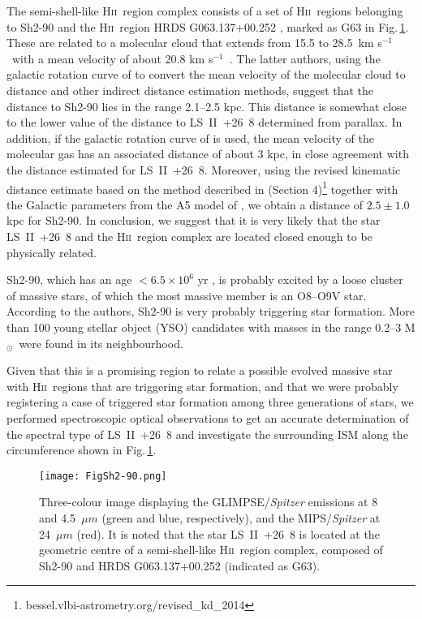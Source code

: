 \documentclass[fleqn,usenatbib]{mnras}
\def\ks{km s$^{-1}$}
\def\hii{H\textsc{ii}}
\def\msol{M$_\odot$}
\begin{document}
The semi-shell-like H\textsc{ii}~region complex consists of a set of \hii~regions belonging to 
Sh2-90 \citep{1959ApJS....4..257S} and the \hii~region HRDS G063.137+00.252 \citep{2012ApJ...759...96B}, 
marked as G63 in Fig.\,\ref{fig:Sh2-90}. These are related to a molecular cloud that extends 
from 15.5 to 28.5~km s$^{-1}$~with a mean velocity of about 20.8  \ks~\citep{1983A&A...124....1L,2014A&A...566A.122S}. 
The latter authors, using the galactic rotation curve of \citet{brand93} to convert the 
mean velocity of the molecular cloud to distance and other indirect distance estimation methods, 
suggest that the distance to Sh2-90 lies in the range 2.1--2.5 kpc. This distance is 
somewhat close to the lower value of the distance to LS~II~+26~8 determined from parallax. 
In addition, if the galactic rotation curve of \citet{fich89} is used, the mean velocity of 
the molecular gas has an associated distance of about 3 kpc, in close agreement with the distance estimated for LS~II~+26~8.   
Moreover, using the revised kinematic distance estimate based on the method described in 
\citet{reid09} (Section 4)\footnote{bessel.vlbi-astrometry.org/revised\_kd\_2014} together with the 
Galactic parameters from the A5 model of \citet{reid14}, we obtain a distance of $2.5\pm1.0$ kpc 
for Sh2-90. In conclusion, we suggest that it is very likely that the star LS~II~+26~8 and the 
\hii~region complex are located closed enough to be physically related.

Sh2-90, which has an age $< 6.5 \times 10^{6}$ yr \citep{2014A&A...566A.122S}, is probably 
excited by a loose cluster of massive stars, of which the most massive member is an O8--O9V 
star. According to the authors, Sh2-90 is very probably triggering star formation. More than 100 
young stellar object (YSO) candidates with masses in the range 0.2--3 \msol~were found in its neighbourhood.

Given that this is a promising region to relate a possible evolved massive star with 
\hii~regions that are triggering star formation, and that we were probably registering a case of 
triggered star formation among three generations of stars, we performed spectroscopic optical 
observations to get an accurate determination of the spectral type of LS~II~+26~8 and investigate the 
surrounding ISM along the circumference shown in Fig.\,\ref{fig:Sh2-90}.


\begin{figure}
    \centering
	\texttt{[image: FigSh2-90.png]}
    \caption{Three-colour image displaying the GLIMPSE/{\it Spitzer} emissions at 8 and 4.5~$\mu m$ 
(green and blue, respectively), and the MIPS/{\it Spitzer} at 24~$\mu m$ (red). It is noted 
that the star LS~II~+26~8 is located at the geometric centre of a semi-shell-like \hii~region
 complex, composed of Sh2-90 and HRDS G063.137+00.252 (indicated as G63).}
    \label{fig:Sh2-90}
\end{figure}
\end{document}
